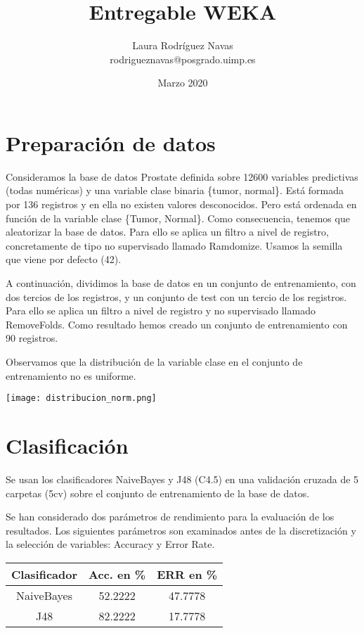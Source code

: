 \documentclass{article}
\title{Entregable WEKA}
\author{Laura Rodríguez Navas \\ rodrigueznavas@posgrado.uimp.es}
\date{Marzo 2020}
\begin{document}
\maketitle

\section*{Preparación de datos}

Consideramos la base de datos Prostate definida sobre 12600 variables predictivas (todas numéricas) y una variable clase binaria \{tumor, normal\}. Está formada por 136 registros y en ella no existen valores desconocidos. Pero está ordenada en función de la variable clase \{Tumor, Normal\}. Como consecuencia, tenemos que aleatorizar la base de datos. Para ello se aplica un filtro a nivel de registro, concretamente de tipo no supervisado llamado Ramdomize. Usamos la semilla que viene por defecto (42).

A continuación, dividimos la base de datos en un conjunto de entrenamiento, con dos tercios de los registros, y un conjunto de test con un tercio de los registros. Para ello se aplica un filtro a nivel de registro y no supervisado llamado RemoveFolds. Como resultado hemos creado un conjunto de entrenamiento con 90 registros.

Observamos que la distribución de la variable clase en el conjunto de entrenamiento no es uniforme.

\begin{center}
	\texttt{[image: distribucion\_norm.png]}
\end{center}

\section*{Clasificación}

Se usan los clasificadores NaiveBayes y J48 (C4.5) en una validación cruzada de 5 carpetas (5cv) sobre el conjunto de entrenamiento de la base de datos.

Se han considerado dos parámetros de rendimiento para la evaluación de los resultados. Los siguientes parámetros son examinados antes de la discretización y la selección de variables: Accuracy y Error Rate. 

\begin{center}
	\begin{tabular}{ |c|c|c| } 
		\hline
		Clasificador & Acc. en \% & ERR en \% \\
		\hline
		NaiveBayes & 52.2222 & 47.7778 \\ 
		J48 & 82.2222 & 17.7778 \\ 
		\hline
	\end{tabular}
\end{center}
\end{document}
